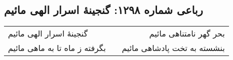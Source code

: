 \begin{center}
\section*{رباعی شماره ۱۲۹۸: گنجینهٔ اسرار الهی مائیم}
\label{sec:1298}
\begin{longtable}{l p{0.5cm} r}
گنجینهٔ اسرار الهی مائیم
&&
بحر گهر نامتناهی مائیم
\\
بگرفته ز ماه تا به ماهی مائیم
&&
بنشسته به تخت پادشاهی مائیم
\\
\end{longtable}
\end{center}
